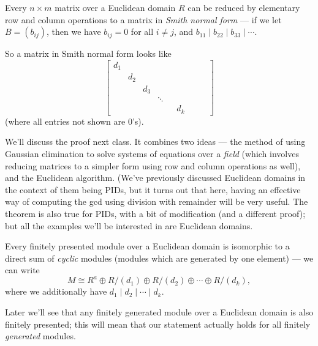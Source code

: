 \begin{theorem} \label{Smith normal form}
Every $n \times m$ matrix over a Euclidean domain $R$ can be reduced by elementary row and column operations to a matrix in \emph{Smith normal form} --- if we let $B = (b_{ij})$, then we have $b_{ij} = 0$ for all $i \neq j$, and $b_{11} \mid b_{22} \mid b_{33} \mid \cdots$.  %
\end{theorem}

So a matrix in Smith normal form looks like \[\begin{bmatrix} d_1 \\ & d_2 \\ & & d_3 \\ & & & \ddots \\ & & & & & d_k & & & \end{bmatrix}\] (where all entries not shown are $0$'s). 

We'll discuss the proof next class. It combines two ideas --- the method of using Gaussian elimination to solve systems of equations over a \emph{field} (which involves reducing matrices to a simpler form using row and column operations as well), and the Euclidean algorithm. (We've previously discussed Euclidean domains in the context of them being PIDs, but it turns out that here, having an effective way of computing the gcd using division with remainder will be very useful. The theorem is also true for PIDs, with a bit of modification (and a different proof); but all the examples we'll be interested in are Euclidean domains. 


\begin{corollary}
Every finitely presented module over a Euclidean domain is isomorphic to a direct sum of \emph{cyclic} modules (modules which are generated by one element) --- we can write \[M \cong R^a \oplus R/(d_1) \oplus R/(d_2) \oplus \cdots \oplus R/(d_k),\] where we additionally have $d_1 \mid d_2 \mid \cdots \mid d_k$. 
\end{corollary}

Later we'll see that any finitely generated module over a Euclidean domain is also finitely presented; this will mean that our statement actually holds for all finitely \emph{generated} modules. 

